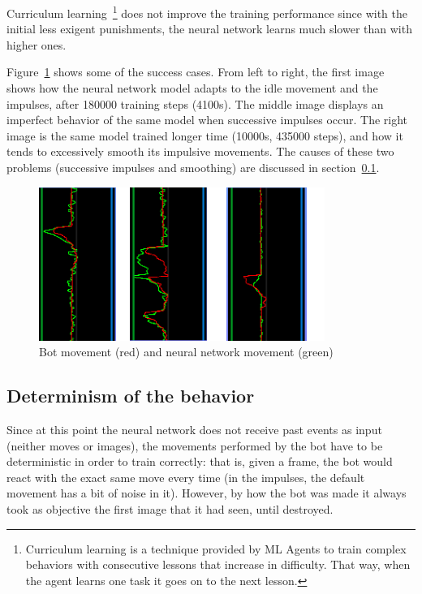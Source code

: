 Curriculum learning~\footnote{Curriculum learning is a technique provided by ML Agents to train complex behaviors with consecutive lessons that increase in difficulty. That way, when the agent learns one task it goes on to the next lesson.} does not improve the training performance since with the initial less exigent punishments, the neural network learns much slower than with higher ones.

Figure~\ref{fig:graphTR} shows some of the success cases. From left to right, the first image shows how the neural network model adapts to the idle movement and the impulses, after 180000 training steps (4100s). The middle image displays an imperfect behavior of the same model when successive impulses occur. The right image is the same model trained longer time (10000s, 435000 steps), and how it tends to excessively smooth its impulsive movements. The causes of these two problems (successive impulses and smoothing) are discussed in section~\ref{sec:determ}.
\begin{figure}[h]
  \centering
		\includegraphics[width=.9\textwidth]{img/graphsTR.png}
  \caption{Bot movement (red) and neural network movement (green)}
  \label{fig:graphTR}
\end{figure}

\subsection{Determinism of the behavior}
\label{sec:determ}

Since at this point the neural network does not receive past events as input (neither moves or images), the movements performed by the bot have to be deterministic in order to train correctly: that is, given a frame, the bot would react with the exact same move every time (in the impulses, the default movement has a bit of noise in it). However, by how the bot was made it always took as objective the first image that it had seen, until destroyed.

